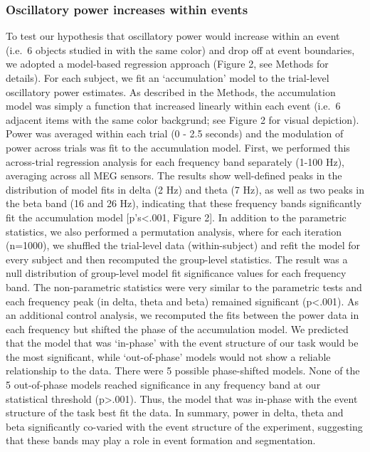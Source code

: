 \subsubsection{Oscillatory power increases within
events}\label{oscillatory-power-increases-within-events}

To test our hypothesis that oscillatory power would increase within an
event (i.e.~6 objects studied in with the same color) and drop off at
event boundaries, we adopted a model-based regression approach (Figure
2, see Methods for details). For each subject, we fit an `accumulation'
model to the trial-level oscillatory power estimates. As described in
the Methods, the accumulation model was simply a function that increased
linearly within each event (i.e.~6 adjacent items with the same color
backgrund; see Figure 2 for visual depiction). Power was averaged within
each trial (0 - 2.5 seconds) and the modulation of power across trials
was fit to the accumulation model. First, we performed this across-trial
regression analysis for each frequency band separately (1-100 Hz),
averaging across all MEG sensors. The results show well-defined peaks in
the distribution of model fits in delta (2 Hz) and theta (7 Hz), as well
as two peaks in the beta band (16 and 26 Hz), indicating that these
frequency bands significantly fit the accumulation model
{[}p's\textless{}.001, Figure 2{]}. In addition to the parametric
statistics, we also performed a permutation analysis, where for each
iteration (n=1000), we shuffled the trial-level data (within-subject)
and refit the model for every subject and then recomputed the
group-level statistics. The result was a null distribution of
group-level model fit significance values for each frequency band. The
non-parametric statistics were very similar to the parametric tests and
each frequency peak (in delta, theta and beta) remained significant
(p\textless{}.001). As an additional control analysis, we recomputed the
fits between the power data in each frequency but shifted the phase of
the accumulation model. We predicted that the model that was `in-phase'
with the event structure of our task would be the most significant,
while `out-of-phase' models would not show a reliable relationship to
the data. There were 5 possible phase-shifted models. None of the 5
out-of-phase models reached significance in any frequency band at our
statistical threshold (p\textgreater{}.001). Thus, the model that was
in-phase with the event structure of the task best fit the data. In
summary, power in delta, theta and beta significantly co-varied with the
event structure of the experiment, suggesting that these bands may play
a role in event formation and segmentation.

